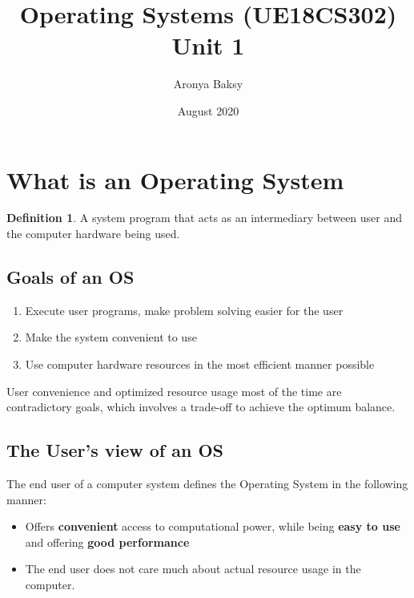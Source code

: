 \documentclass{article}
\title{Operating Systems (UE18CS302) \\
    \large Unit 1}
\author{Aronya Baksy}
\date{August 2020}
\theoremstyle{plain}
\theoremstyle{definition}
\newtheorem{defn}{Definition} %
\begin{document}
\maketitle

\section{What is an Operating System}
    \begin{defn}
        A system program that acts as an intermediary between user and the computer hardware being used.
    \end{defn}
    
    \subsection{Goals of an OS}
    
        \begin{enumerate}
            \item Execute user programs, make problem solving easier for the user
            
            
            \item Make the system convenient to use
            
            \item Use computer hardware resources in the most efficient manner possible
        \end{enumerate}
        
        User convenience and optimized resource usage most of the time are contradictory goals, which involves a trade-off to achieve the optimum balance. 
    
    \subsection{The User's view of an OS}
    The end user of a computer system defines the Operating System in the following manner:
    
    \begin{itemize}
        \item Offers \textbf{convenient} access to computational power, while being \textbf{easy to use} and offering \textbf{good performance}
        
        \item The end user does not care much about actual resource usage in the computer.
    
    \end{itemize}
    
\end{document}
